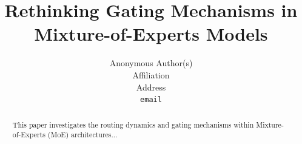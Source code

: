\documentclass{article}
\title{Rethinking Gating Mechanisms in Mixture-of-Experts Models}
\author{%
  Anonymous Author(s)\\
  Affiliation\\
  Address\\
  \texttt{email} \\
}
\begin{document}
\maketitle

\begin{abstract}
  This paper investigates the routing dynamics and gating mechanisms within Mixture-of-Experts (MoE) architectures...
\end{abstract}













\begin{ack}
\end{ack}




\newpage
\appendix
% 

\newpage

\end{document}
